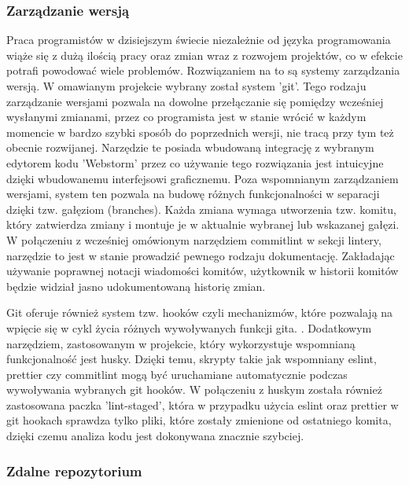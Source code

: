\subsubsection{Zarządzanie wersją}

Praca programistów w dzisiejszym świecie niezależnie od języka programowania wiąże się z dużą ilością pracy oraz zmian wraz z rozwojem projektów, co w efekcie potrafi powodować wiele problemów. Rozwiązaniem na to są systemy zarządzania wersją. W omawianym projekcie wybrany został system 'git'. Tego rodzaju zarządzanie wersjami pozwala na dowolne przełączanie się pomiędzy wcześniej wysłanymi zmianami, przez co programista jest w stanie wrócić w każdym momencie w bardzo szybki sposób do poprzednich wersji, nie tracą przy tym też obecnie rozwijanej. Narzędzie te posiada wbudowaną integrację z wybranym edytorem kodu 'Webstorm' przez co używanie tego rozwiązania jest intuicyjne dzięki wbudowanemu interfejsowi graficznemu. Poza wspomnianym zarządzaniem wersjami, system ten pozwala na budowę różnych funkcjonalności w separacji dzięki tzw. gałęziom (branches). Każda zmiana wymaga utworzenia tzw. komitu, który zatwierdza zmiany i montuje je w aktualnie wybranej lub wskazanej gałęzi.
W połączeniu z wcześniej omówionym narzędziem commitlint w sekcji lintery, narzędzie to jest w stanie prowadzić pewnego rodzaju dokumentację. Zakładając używanie poprawnej notacji wiadomości komitów, użytkownik w historii komitów będzie widział jasno udokumentowaną historię zmian.

Git oferuje również system tzw. hooków czyli mechanizmów, które pozwalają na wpięcie się w cykl życia różnych wywoływanych funkcji gita. \cite{GitHooksDocs}. Dodatkowym narzędziem, zastosowanym w projekcie, który wykorzystuje wspomnianą funkcjonalność jest husky. Dzięki temu, skrypty takie jak wspomniany eslint, prettier czy commitlint mogą być uruchamiane automatycznie podczas wywoływania wybranych git hooków. W połączeniu z huskym została również zastosowana paczka 'lint-staged', która w przypadku użycia eslint oraz prettier w git hookach sprawdza tylko pliki, które zostały zmienione od ostatniego komita, dzięki czemu analiza kodu jest dokonywana znacznie szybciej.

\subsubsection{Zdalne repozytorium}

